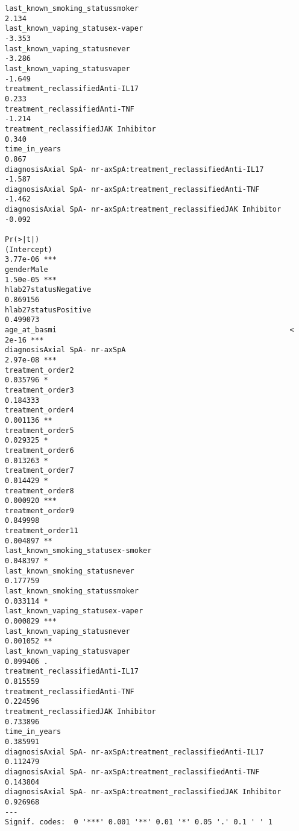 \documentclass[
  letterpaper,
  DIV=11,
  numbers=noendperiod]{scrartcl}
\begin{document}
\begin{verbatim}
last_known_smoking_statussmoker                                    2.134
last_known_vaping_statusex-vaper                                  -3.353
last_known_vaping_statusnever                                     -3.286
last_known_vaping_statusvaper                                     -1.649
treatment_reclassifiedAnti-IL17                                    0.233
treatment_reclassifiedAnti-TNF                                    -1.214
treatment_reclassifiedJAK Inhibitor                                0.340
time_in_years                                                      0.867
diagnosisAxial SpA- nr-axSpA:treatment_reclassifiedAnti-IL17      -1.587
diagnosisAxial SpA- nr-axSpA:treatment_reclassifiedAnti-TNF       -1.462
diagnosisAxial SpA- nr-axSpA:treatment_reclassifiedJAK Inhibitor  -0.092
                                                                 Pr(>|t|)    
(Intercept)                                                      3.77e-06 ***
genderMale                                                       1.50e-05 ***
hlab27statusNegative                                             0.869156    
hlab27statusPositive                                             0.499073    
age_at_basmi                                                      < 2e-16 ***
diagnosisAxial SpA- nr-axSpA                                     2.97e-08 ***
treatment_order2                                                 0.035796 *  
treatment_order3                                                 0.184333    
treatment_order4                                                 0.001136 ** 
treatment_order5                                                 0.029325 *  
treatment_order6                                                 0.013263 *  
treatment_order7                                                 0.014429 *  
treatment_order8                                                 0.000920 ***
treatment_order9                                                 0.849998    
treatment_order11                                                0.004897 ** 
last_known_smoking_statusex-smoker                               0.048397 *  
last_known_smoking_statusnever                                   0.177759    
last_known_smoking_statussmoker                                  0.033114 *  
last_known_vaping_statusex-vaper                                 0.000829 ***
last_known_vaping_statusnever                                    0.001052 ** 
last_known_vaping_statusvaper                                    0.099406 .  
treatment_reclassifiedAnti-IL17                                  0.815559    
treatment_reclassifiedAnti-TNF                                   0.224596    
treatment_reclassifiedJAK Inhibitor                              0.733896    
time_in_years                                                    0.385991    
diagnosisAxial SpA- nr-axSpA:treatment_reclassifiedAnti-IL17     0.112479    
diagnosisAxial SpA- nr-axSpA:treatment_reclassifiedAnti-TNF      0.143804    
diagnosisAxial SpA- nr-axSpA:treatment_reclassifiedJAK Inhibitor 0.926968    
---
Signif. codes:  0 '***' 0.001 '**' 0.01 '*' 0.05 '.' 0.1 ' ' 1
\end{verbatim}
\end{document}
